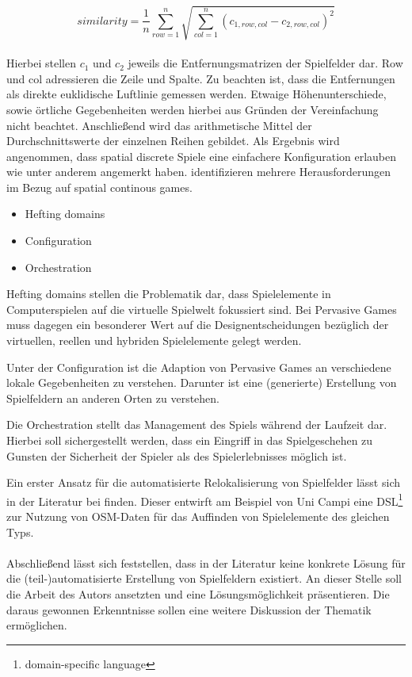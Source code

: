 \begin{equation}
similarity = \frac{1}{n} \sum_{row=1}^{n} \sqrt{ \sum_{col=1}^{n} (c_{1,row,col} - c_{2,row,col})^2 }
\end{equation}
\\
Hierbei stellen $c_1$ und $c_2$ jeweils die Entfernungsmatrizen der Spielfelder dar.
Row und col adressieren die Zeile und Spalte.
Zu beachten ist, dass die Entfernungen als direkte euklidische Luftlinie gemessen werden. Etwaige Höhenunterschiede, sowie örtliche Gegebenheiten werden hierbei aus Gründen der Vereinfachung nicht beachtet. Anschließend wird das arithmetische Mittel der Durchschnittswerte der einzelnen Reihen gebildet.
Als Ergebnis wird angenommen, dass spatial discrete Spiele eine einfachere Konfiguration erlauben wie unter anderem \textcite{Benford.2005} angemerkt haben.
\textcite{Benford.2005} identifizieren mehrere Herausforderungen im Bezug auf spatial continous games.

\begin{itemize}
\item Hefting domains
\item Configuration
\item Orchestration
\end{itemize}

Hefting domains stellen die Problematik dar, dass Spielelemente in Computerspielen auf die virtuelle Spielwelt fokussiert sind. Bei Pervasive Games muss dagegen ein besonderer Wert auf die Designentscheidungen bezüglich der virtuellen, reellen und hybriden Spielelemente gelegt werden.

Unter der Configuration ist die Adaption von Pervasive Games an verschiedene lokale Gegebenheiten zu verstehen. Darunter ist eine  (generierte) Erstellung von Spielfeldern an anderen Orten zu verstehen.

Die Orchestration stellt das Management des Spiels während der Laufzeit dar. Hierbei soll sichergestellt werden, dass ein Eingriff in das Spielgeschehen zu Gunsten der Sicherheit der Spieler als des Spielerlebnisses möglich ist.

Ein erster Ansatz für die automatisierte Relokalisierung von Spielfelder lässt sich in der Literatur bei \textcite{Mannara.2012} finden. Dieser entwirft am Beispiel von Uni Campi eine DSL\footnote{domain-specific language} zur Nutzung von OSM-Daten für das Auffinden von Spielelemente des gleichen Typs.
\\\\
Abschließend lässt sich feststellen, dass in der Literatur keine konkrete Lösung für die (teil-)automatisierte Erstellung von Spielfeldern existiert.
An dieser Stelle soll die Arbeit des Autors ansetzten und eine Lösungsmöglichkeit präsentieren.
Die daraus gewonnen Erkenntnisse sollen eine weitere Diskussion der Thematik ermöglichen.

